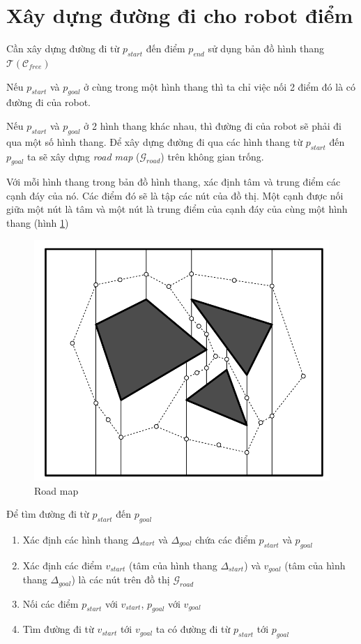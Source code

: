\documentclass[a4paper,12pt]{report}
\begin{document}
\section{Xây dựng đường đi cho robot điểm}
Cần xây dựng đường đi từ $p_{start}$ đến điểm $p_{end}$ sử dụng bản đồ hình thang $\mathcal{T}(\mathcal{C}_{free})$
\par Nếu $p_{start}$ và $p_{goal}$ ở cùng trong một hình thang thì ta chỉ việc nối 2 điểm đó là có đường đi của robot.
\par Nếu $p_{start}$ và $p_{goal}$ ở 2 hình thang khác nhau, thì đường đi của robot sẽ phải đi qua một số hình thang. Để xây dựng đường đi qua các hình thang từ $p_{start}$ đến $p_{goal}$ ta sẽ xây dựng \emph{road map} ($\mathcal{G}_{road}$) trên không gian trống. 
\par Với mỗi hình thang trong bản đồ hình thang, xác định tâm và trung điểm các cạnh đáy của nó. Các điểm đó sẽ là tập các nút của đồ thị. Một cạnh được nối giữa một nút là tâm và một nút là trung điểm của cạnh đáy của cùng một hình thang (hình \ref{road_map})
\begin{figure}[H]
\centering
\label{road_map}
\includegraphics[scale=0.25]{road_map.png}
\caption{Road map}
\end{figure}

\par Để tìm đường đi từ $p_{start}$ đến $p_{goal}$
\begin{enumerate}
\item Xác định các hình thang $\Delta_{start}$ và $\Delta_{goal}$ chứa các điểm $p_{start}$ và $p_{goal}$
\item Xác định các điểm $v_{start}$ (tâm của hình thang $\Delta_{start}$) và $v_{goal}$ (tâm của hình thang $\Delta_{goal}$) là các nút trên đồ thị $\mathcal{G}_{road}$
\item Nối các điểm $p_{start}$ với $v_{start}$, $p_{goal}$ với $v_{goal}$
\item Tìm đường đi từ $v_{start}$ tới $v_{goal}$ ta có đường đi từ $p_{start}$ tới $p_{goal}$
\end{enumerate}
\end{document}
